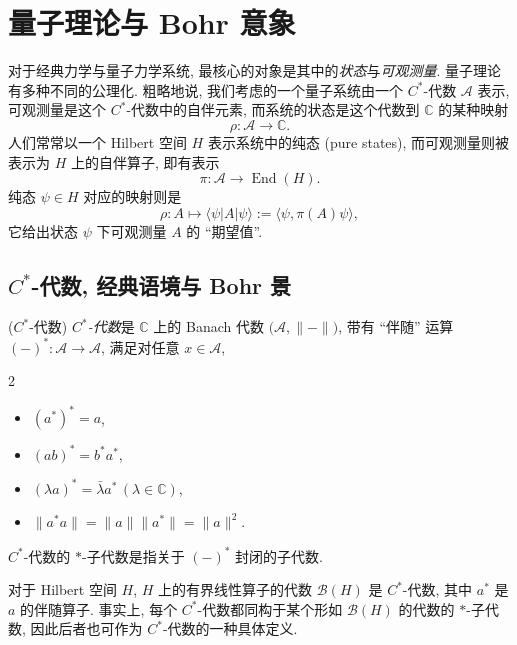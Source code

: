 \section{量子理论与 Bohr 意象}

对于经典力学与量子力学系统, 最核心的对象是其中的\emph{状态}与\emph{可观测量}.
量子理论有多种不同的公理化. 粗略地说, 我们考虑的一个量子系统由一个 $C^*$-代数 $\mathcal A$ 表示, 可观测量是这个 $C^*$-代数中的自伴元素, 而系统的状态是这个代数到 $\mathbb{C}$ 的某种映射 $$\rho\colon \mathcal A \to \mathbb{C}.$$ 人们常常以一个 Hilbert 空间 $H$ 表示系统中的纯态 (pure states), 而可观测量则被表示为 $H$ 上的自伴算子, 即有表示 $$\pi\colon \mathcal A \to \operatorname{End}(H).$$ 纯态 $\psi\in H$ 对应的映射则是
$$
\rho\colon A\mapsto \langle\psi | A | \psi \rangle := \langle\psi,\pi(A)\psi\rangle,
$$
它给出状态 $\psi$ 下可观测量 $A$ 的 ``期望值''.

\subsection{$C^*$-代数, 经典语境与 Bohr 景}

\begin{definition}
    {($C^*$-代数)}
    \emph{$C^*$-代数}是 $\mathbb{C}$ 上的 Banach 代数 $\big(\mathcal A,\|{-}\|\big)$,
    带有 ``伴随'' 运算 $(-)^*\colon \mathcal A \to \mathcal A$,
    满足对任意 $x\in \mathcal A$,
    \begin{multicols}
    	{2}
    	\begin{itemize}
    		\item $(a^*)^*=a$,
    		\item $(ab)^*=b^*a^*$,
    		\item $(\lambda a)^*=\bar\lambda a^*\,(\lambda\in\mathbb{C})$,
    		\item $\|a^* a\|=\|a\|\|a^*\|=\|a\|^2$.
    	\end{itemize}
    \end{multicols}
    $C^*$-代数的 $*$-子代数是指关于 $(-)^*$ 封闭的子代数.
\end{definition}

\begin{example}
    {}
    对于 Hilbert 空间 $H$, $H$ 上的有界线性算子的代数 $\mathcal B(H)$ 是 $C^*$-代数, 其中 $a^*$ 是 $a$ 的伴随算子. 事实上, 每个 $C^*$-代数都同构于某个形如 $\mathcal B(H)$ 的代数的 $*$-子代数, 因此后者也可作为 $C^*$-代数的一种具体定义.
\end{example}

